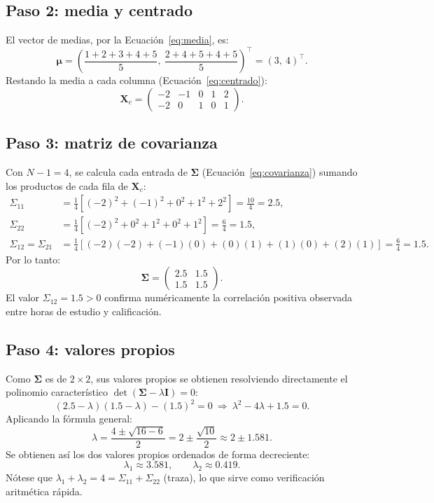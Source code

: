 \documentclass[11pt,letterpaper]{article}
\begin{document}
	\subsection{Paso 2: media y centrado}
	
	El vector de medias, por la Ecuación~\eqref{eq:media}, es:
	\[
	\boldsymbol{\mu} = \left( \frac{1+2+3+4+5}{5},\ \frac{2+4+5+4+5}{5} \right)^{\top} = (3,\ 4)^{\top}.
	\]
	Restando la media a cada columna (Ecuación~\eqref{eq:centrado}):
	\[
	\mathbf{X}_c = \begin{pmatrix} -2 & -1 & 0 & 1 & 2 \\ -2 & 0 & 1 & 0 & 1 \end{pmatrix}.
	\]
	
	\subsection{Paso 3: matriz de covarianza}
	
	Con $N-1=4$, se calcula cada entrada de $\boldsymbol{\Sigma}$ (Ecuación~\eqref{eq:covarianza}) sumando los productos de cada fila de $\mathbf{X}_c$:
	\begin{align*}
		\Sigma_{11} &= \tfrac{1}{4}\left[(-2)^2+(-1)^2+0^2+1^2+2^2\right] = \tfrac{10}{4} = 2.5, \\
		\Sigma_{22} &= \tfrac{1}{4}\left[(-2)^2+0^2+1^2+0^2+1^2\right] = \tfrac{6}{4} = 1.5, \\
		\Sigma_{12} = \Sigma_{21} &= \tfrac{1}{4}\left[(-2)(-2)+(-1)(0)+(0)(1)+(1)(0)+(2)(1)\right] = \tfrac{6}{4} = 1.5.
	\end{align*}
	Por lo tanto:
	\[
	\boldsymbol{\Sigma} = \begin{pmatrix} 2.5 & 1.5 \\ 1.5 & 1.5 \end{pmatrix}.
	\]
	El valor $\Sigma_{12}=1.5>0$ confirma numéricamente la correlación positiva observada entre horas de estudio y calificación.
	
	\subsection{Paso 4: valores propios}
	
	Como $\boldsymbol{\Sigma}$ es de $2\times 2$, sus valores propios se obtienen resolviendo directamente el polinomio característico $\det(\boldsymbol{\Sigma}-\lambda\mathbf{I})=0$:
	\[
	(2.5-\lambda)(1.5-\lambda) - (1.5)^2 = 0 \ \Longrightarrow\ \lambda^2 - 4\lambda + 1.5 = 0.
	\]
	Aplicando la fórmula general:
	\[
	\lambda = \frac{4 \pm \sqrt{16 - 6}}{2} = 2 \pm \frac{\sqrt{10}}{2} \approx 2 \pm 1.581.
	\]
	Se obtienen así los dos valores propios ordenados de forma decreciente:
	\[
	\lambda_1 \approx 3.581, \qquad \lambda_2 \approx 0.419.
	\]
	Nótese que $\lambda_1+\lambda_2 = 4 = \Sigma_{11}+\Sigma_{22}$ (traza), lo que sirve como verificación aritmética rápida.
	
\end{document}
